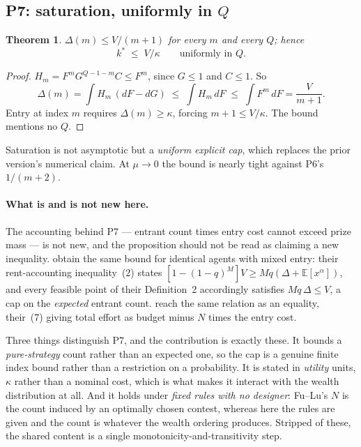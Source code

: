 \documentclass[11pt]{article}
\newtheorem{theorem}{Theorem}
\begin{document}
\subsection{P7: saturation, uniformly in \texorpdfstring{$Q$}{Q}}
\label{prop:P7}
\begin{theorem}
$\Delta(m)\le V/(m{+}1)$ for every $m$ and every $Q$; hence
\[
  k^* \;\le\; V/\kappa \qquad\text{uniformly in } Q.
\]
\end{theorem}
\begin{proof}
$H_m=F^mG^{Q-1-m}C\le F^m$, since $G\le1$ and $C\le1$. So
\[
  \Delta(m)=\int H_m\,(dF-dG) \;\le\; \int H_m\,dF \;\le\; \int
  F^m\,dF = \frac{V}{m+1}.
\]
Entry at index $m$ requires $\Delta(m)\ge\kappa$, forcing
$m+1\le V/\kappa$. The bound mentions no $Q$.
\end{proof}
Saturation is not asymptotic but a \emph{uniform explicit cap}, which replaces
the prior version's numerical claim. At $\mu\to0$ the bound is nearly tight
against P6's $1/(m{+}2)$.

\paragraph{What is and is not new here.} The accounting behind P7 --- entrant
count times entry cost cannot exceed prize mass --- is not new, and the
proposition should not be read as claiming a new inequality.
\citet{FuJiaoLu2015} obtain the same bound for identical agents with mixed
entry: their rent-accounting inequality~(2) states
$[1-(1-q)^M]V \geq Mq(\Delta + \mathbb{E}[x^\alpha])$, and every feasible point
of their Definition~2 accordingly satisfies $Mq\,\Delta \leq V$, a cap on the
\emph{expected} entrant count. \citet{FuLu2010} reach the same relation as an
equality, their~(7) giving total effort as budget minus $N$ times the entry
cost.

Three things distinguish P7, and the contribution is exactly these. It bounds a
\emph{pure-strategy} count rather than an expected one, so the cap is a genuine
finite index bound rather than a restriction on a probability. It is stated in
\emph{utility} units, $\kappa$ rather than a nominal cost, which is what makes
it interact with the wealth distribution at all. And it holds under
\emph{fixed rules with no designer}: Fu--Lu's $N$ is the count induced by an
optimally chosen contest, whereas here the rules are given and the count is
whatever the wealth ordering produces. Stripped of these, the shared content is
a single monotonicity-and-transitivity step.
\end{document}
